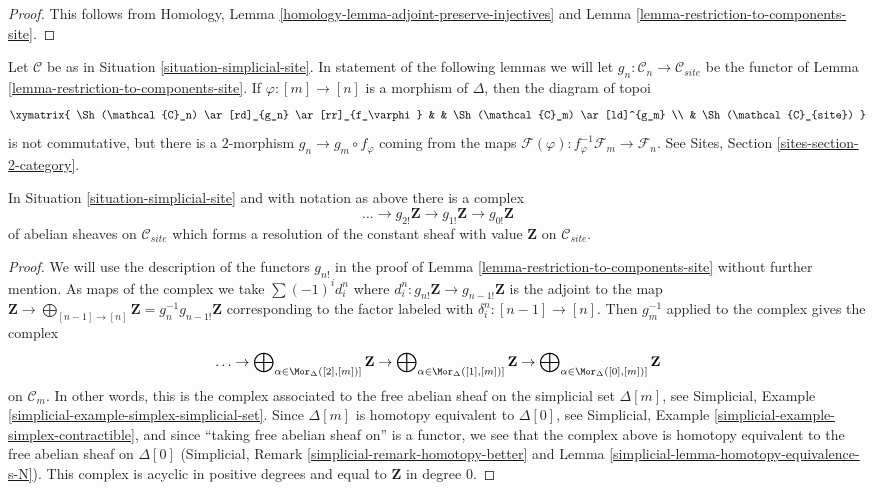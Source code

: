 \begin{proof}
This follows from
Homology, Lemma \ref{homology-lemma-adjoint-preserve-injectives}
and
Lemma \ref{lemma-restriction-to-components-site}.
\end{proof}

\noindent
Let $\mathcal{C}$ be as in Situation \ref{situation-simplicial-site}.
In statement of the following lemmas we will let
$g_n : \mathcal{C}_n \to \mathcal{C}_{site}$ be the functor of
Lemma \ref{lemma-restriction-to-components-site}. If $\varphi : [m] \to [n]$
is a morphism of $\Delta$, then the diagram of topoi
$$
\xymatrix{
\Sh(\mathcal{C}_n) \ar[rd]_{g_n} \ar[rr]_{f_\varphi} & &
\Sh(\mathcal{C}_m) \ar[ld]^{g_m} \\
& \Sh(\mathcal{C}_{site})
}
$$
is not commutative, but there is a $2$-morphism $g_n \to g_m \circ f_\varphi$
coming from the maps
$\mathcal{F}(\varphi) : f_\varphi^{-1}\mathcal{F}_m \to \mathcal{F}_n$.
See Sites, Section \ref{sites-section-2-category}.

\begin{lemma}
\label{lemma-simplicial-resolution-Z-site}
In Situation \ref{situation-simplicial-site} and with notation as above
there is a complex
$$
\ldots \to g_{2!}\mathbf{Z} \to g_{1!}\mathbf{Z} \to g_{0!}\mathbf{Z}
$$
of abelian sheaves on $\mathcal{C}_{site}$ which forms a resolution of
the constant sheaf with value $\mathbf{Z}$ on $\mathcal{C}_{site}$.
\end{lemma}

\begin{proof}
We will use the description of the functors $g_{n!}$ in the proof of
Lemma \ref{lemma-restriction-to-components-site} without further mention.
As maps of the complex we take $\sum (-1)^i d^n_i$ where
$d^n_i : g_{n!}\mathbf{Z} \to g_{n - 1!}\mathbf{Z}$ is the
adjoint to the map $\mathbf{Z} \to
\bigoplus_{[n - 1] \to [n]} \mathbf{Z} = g_n^{-1}g_{n - 1!}\mathbf{Z}$
corresponding to the factor labeled with $\delta^n_i : [n - 1] \to [n]$.
Then $g_m^{-1}$ applied to the complex gives the complex
$$
\ldots \to
\bigoplus\nolimits_{\alpha \in \Mor_\Delta([2], [m])]} \mathbf{Z} \to
\bigoplus\nolimits_{\alpha \in \Mor_\Delta([1], [m])]} \mathbf{Z} \to
\bigoplus\nolimits_{\alpha \in \Mor_\Delta([0], [m])]} \mathbf{Z}
$$
on $\mathcal{C}_m$.
In other words, this is the complex associated to the
free abelian sheaf on the simplicial set $\Delta[m]$, see
Simplicial, Example \ref{simplicial-example-simplex-simplicial-set}.
Since $\Delta[m]$ is homotopy equivalent to $\Delta[0]$, see
Simplicial, Example \ref{simplicial-example-simplex-contractible},
and since ``taking free abelian sheaf on'' is a functor,
we see that the complex above is homotopy equivalent to
the free abelian sheaf on $\Delta[0]$
(Simplicial, Remark \ref{simplicial-remark-homotopy-better} and
Lemma \ref{simplicial-lemma-homotopy-equivalence-s-N}).
This complex is acyclic in positive degrees
and equal to $\mathbf{Z}$ in degree $0$.
\end{proof}

